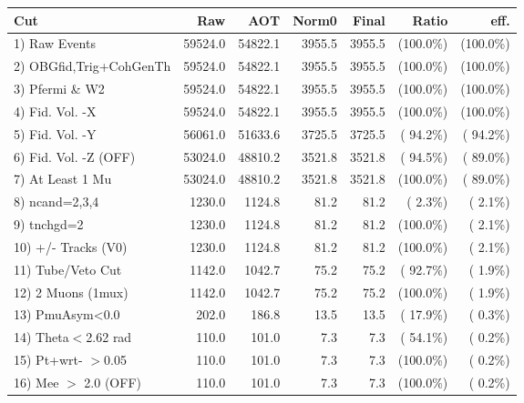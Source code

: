  \begin{table}[h!]\centering
 \begin{tabular}{||l||r|r|r|r|r|r||}
 \hline
 \hline
 Cut & Raw & AOT & Norm0 & Final & Ratio & eff.       \\
 \hline
  1) Raw Events           &      59524.0 &      54822.1 &       3955.5 &       3955.5 & (100.0\%) & (100.0\%) \\
  2) OBGfid,Trig+CohGenTh &      59524.0 &      54822.1 &       3955.5 &       3955.5 & (100.0\%) & (100.0\%) \\
  3) Pfermi \& W2         &      59524.0 &      54822.1 &       3955.5 &       3955.5 & (100.0\%) & (100.0\%) \\
  4) Fid. Vol. -X         &      59524.0 &      54822.1 &       3955.5 &       3955.5 & (100.0\%) & (100.0\%) \\
  5) Fid. Vol. -Y         &      56061.0 &      51633.6 &       3725.5 &       3725.5 & ( 94.2\%) & ( 94.2\%) \\
  6) Fid. Vol. -Z (OFF)   &      53024.0 &      48810.2 &       3521.8 &       3521.8 & ( 94.5\%) & ( 89.0\%) \\
  7) At Least 1 Mu        &      53024.0 &      48810.2 &       3521.8 &       3521.8 & (100.0\%) & ( 89.0\%) \\
  8) ncand=2,3,4          &       1230.0 &       1124.8 &         81.2 &         81.2 & (  2.3\%) & (  2.1\%) \\
  9) tnchgd=2             &       1230.0 &       1124.8 &         81.2 &         81.2 & (100.0\%) & (  2.1\%) \\
 10) +/- Tracks (V0)      &       1230.0 &       1124.8 &         81.2 &         81.2 & (100.0\%) & (  2.1\%) \\
 11) Tube/Veto Cut        &       1142.0 &       1042.7 &         75.2 &         75.2 & ( 92.7\%) & (  1.9\%) \\
 12) 2 Muons (1mux)       &       1142.0 &       1042.7 &         75.2 &         75.2 & (100.0\%) & (  1.9\%) \\
 13) PmuAsym<0.0          &        202.0 &        186.8 &         13.5 &         13.5 & ( 17.9\%) & (  0.3\%) \\
 14) Theta$<$2.62 rad     &        110.0 &        101.0 &          7.3 &          7.3 & ( 54.1\%) & (  0.2\%) \\
 15) Pt+wrt- $>$0.05      &        110.0 &        101.0 &          7.3 &          7.3 & (100.0\%) & (  0.2\%) \\
 16) Mee $>$ 2.0  (OFF)   &        110.0 &        101.0 &          7.3 &          7.3 & (100.0\%) & (  0.2\%) \\

\end{tabular}
\end{table}
